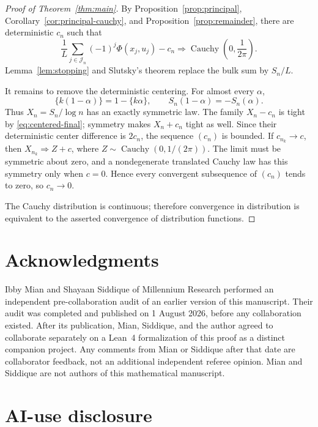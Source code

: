 \documentclass[11pt,a4paper]{amsart}
\theoremstyle{definition}
\theoremstyle{remark}
\begin{document}
\begin{proof}[Proof of Theorem~\ref{thm:main}]
By Proposition~\ref{prop:principal}, Corollary~\ref{cor:principal-cauchy},
and Proposition~\ref{prop:remainder}, there are deterministic $c_n$ such that
\begin{equation}\label{eq:centered-final}
 \frac1L\sum_{j\in\mathcal J_n}(-1)^j\Phi(x_j,u_j)-c_n
 \Longrightarrow \operatorname{Cauchy}\!\left(0,\frac1{2\pi}\right).
\end{equation}
Lemma~\ref{lem:stopping} and Slutsky's theorem replace the bulk sum by
$S_n/L$.

It remains to remove the deterministic centering.  For almost every
$\alpha$,
\[
 \{k(1-\alpha)\}=1-\{k\alpha\},
 \qquad S_n(1-\alpha)=-S_n(\alpha).
\]
Thus $X_n=S_n/\log n$ has an exactly symmetric law.  The family
$X_n-c_n$ is tight by \eqref{eq:centered-final}; symmetry makes
$X_n+c_n$ tight as well.  Since their deterministic center difference is
$2c_n$, the sequence $(c_n)$ is bounded.  If $c_{n_k}\to c$, then
$X_{n_k}\Rightarrow Z+c$, where
$Z\sim\operatorname{Cauchy}(0,1/(2\pi))$.  The limit must be symmetric about
zero, and a nondegenerate translated Cauchy law has this symmetry only when
$c=0$.  Hence every convergent subsequence of $(c_n)$ tends to zero, so
$c_n\to0$.

The Cauchy distribution is continuous; therefore convergence in distribution
is equivalent to the asserted convergence of distribution functions.
\end{proof}

\section*{Acknowledgments}

Ibby Mian and Shayaan Siddique of Millennium Research performed an independent
pre-collaboration audit of an earlier version of this manuscript.  Their audit
was completed and published on 1 August 2026, before any collaboration
existed.  After its publication, Mian, Siddique, and the author agreed to
collaborate separately on a Lean~4 formalization of this proof as a distinct
companion project.  Any
comments from Mian or Siddique after that date are collaborator feedback, not
an additional independent referee opinion.  Mian and Siddique are not authors
of this mathematical manuscript.

\section*{AI-use disclosure}
\end{document}
